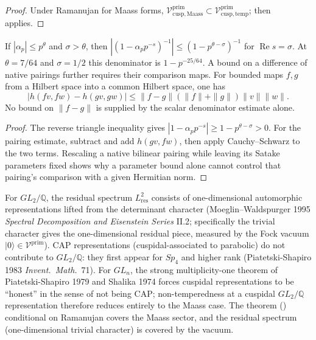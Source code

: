 \begin{proof}
Under Ramanujan for Maass forms, \(\mathcal{V}^{\mathrm{prim}}_{\mathrm{cusp,Maass}}\subset\mathcal{V}^{\mathrm{prim}}_{\mathrm{cusp,temp}}\);
 then applies.
\end{proof}

\begin{proposition}
\label{v4-arith:w5-c:prop:KS-partial}
If $|\alpha_p|\leq p^\theta$ and $\sigma>\theta$, then
$|(1-\alpha_pp^{-s})^{-1}|\leq(1-p^{\theta-\sigma})^{-1}$
for $\operatorname{Re}s=\sigma$. At $\theta=7/64$ and
$\sigma=1/2$ this denominator is $1-p^{-25/64}$.
A bound on a difference of native pairings further requires their
comparison maps. For bounded maps $f,g$ from a Hilbert space
into a common Hilbert space, one has
\begin{equation}
 |h(fv,fw)-h(gv,gw)|
   \leq\|f-g\|(\|f\|+\|g\|)\|v\|\|w\|.
 \label{v4-arith:w5-c:eq:KS-local}
\end{equation}
No bound on $\|f-g\|$ is supplied by the scalar denominator
estimate alone.
\end{proposition}
\begin{proof}
The reverse triangle inequality gives
$|1-\alpha_pp^{-s}|\geq1-p^{\theta-\sigma}>0$.
For the pairing estimate, subtract and add $h(gv,fw)$,
then apply Cauchy--Schwarz to the two terms. Rescaling a native
bilinear pairing while leaving its Satake parameters fixed shows
why a parameter bound alone cannot control that pairing's
comparison with a given Hermitian norm.
\end{proof}

\begin{remark}
\label{v4-arith:w5-c:rem:CAP-residual}
For \(GL_{2}/\mathbb{Q}\), the residual spectrum \(L^{2}_{\mathrm{res}}\)
consists of one-dimensional automorphic representations lifted from
the determinant character (Moeglin--Waldspurger 1995
\emph{Spectral Decomposition and Eisenstein Series} II.2; specifically
the trivial character gives the one-dimensional residual piece,
measured by the Fock vacuum
\(|0\rangle\in\mathcal{V}^{\mathrm{prim}}\)). CAP representations
(cuspidal-associated to parabolic) do not contribute to
\(GL_{2}/\mathbb{Q}\): they first appear for \(Sp_{4}\) and higher rank
(Piatetski-Shapiro 1983 \emph{Invent.~Math.}~71). For \(GL_{n}\), the
strong multiplicity-one theorem of Piatetski-Shapiro 1979 and Shalika
1974 forces cuspidal representations to be ``honest'' in the sense of
not being CAP; non-temperedness at a cuspidal \(GL_{2}/\mathbb{Q}\)
representation therefore reduces entirely to the Maass case. The
theorem
() conditional on Ramanujan
covers the Maass sector, and the residual spectrum (one-dimensional
trivial character) is covered by the vacuum.
\end{remark}


